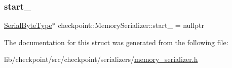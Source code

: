 \mbox{\label{structcheckpoint_1_1_memory_serializer_a6285e7e9821a996f6da9f2e6e59b00c2}} 
\subsubsection{\texorpdfstring{start\+\_\+}{start\_}}
{\footnotesize\ttfamily \hyperlink{namespacecheckpoint_ae57f01cdc0b81776c23b6c7c934c58f5}{Serial\+Byte\+Type}$\ast$ checkpoint\+::\+Memory\+Serializer\+::start\+\_\+ = nullptr\hspace{0.3cm}{\ttfamily [protected]}}



The documentation for this struct was generated from the following file\+:\begin{DoxyCompactItemize}
\item 
lib/checkpoint/src/checkpoint/serializers/\hyperlink{memory__serializer_8h}{memory\+\_\+serializer.\+h}\end{DoxyCompactItemize}
